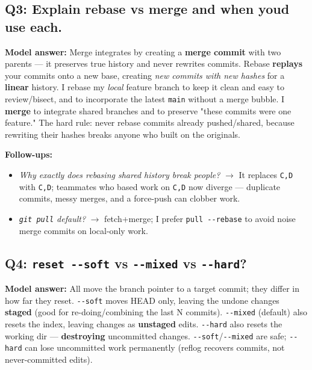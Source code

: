 \documentclass[11pt]{article}
\providecommand{\tightlist}{\setlength{\itemsep}{1pt}\setlength{\parskip}{0pt}}
\begin{document}
\subsection{Q3: Explain rebase vs merge and when you\textquotesingle d use each.}\label{q3-explain-rebase-vs-merge-and-when-youd-use-each}

\textbf{Model answer:} Merge integrates by creating a \textbf{merge commit} with two parents --- it preserves true history and never rewrites commits. Rebase \textbf{replays} your commits onto a new base, creating \emph{new commits with new hashes} for a \textbf{linear} history. I rebase my \emph{local} feature branch to keep it clean and easy to review/bisect, and to incorporate the latest \texttt{main} without a merge bubble. I \textbf{merge} to integrate shared branches and to preserve "these commits were one feature." The hard rule: never rebase commits already pushed/shared, because rewriting their hashes breaks anyone who built on the originals.

\textbf{Follow-ups:}

\begin{itemize}
\tightlist
\item
  \emph{Why exactly does rebasing shared history break people?} \(\rightarrow\) It replaces \texttt{C,D} with \texttt{C\textquotesingle{},D\textquotesingle{}}; teammates who based work on \texttt{C,D} now diverge --- duplicate commits, messy merges, and a force-push can clobber work.
\item
  \emph{\texttt{git\ pull} default?} \(\rightarrow\) fetch+merge; I prefer \texttt{pull\ -\/-rebase} to avoid noise merge commits on local-only work.
\end{itemize}

\subsection{\texorpdfstring{Q4: \texttt{reset\ -\/-soft} vs \texttt{-\/-mixed} vs \texttt{-\/-hard}?}{Q4: reset -\/-soft vs -\/-mixed vs -\/-hard?}}\label{q4-reset---soft-vs---mixed-vs---hard}

\textbf{Model answer:} All move the branch pointer to a target commit; they differ in how far they reset. \texttt{-\/-soft} moves HEAD only, leaving the undone changes \textbf{staged} (good for re-doing/combining the last N commits). \texttt{-\/-mixed} (default) also resets the index, leaving changes as \textbf{unstaged} edits. \texttt{-\/-hard} also resets the working dir --- \textbf{destroying} uncommitted changes. \texttt{-\/-soft}/\texttt{-\/-mixed} are safe; \texttt{-\/-hard} can lose uncommitted work permanently (reflog recovers commits, not never-committed edits).
\end{document}
